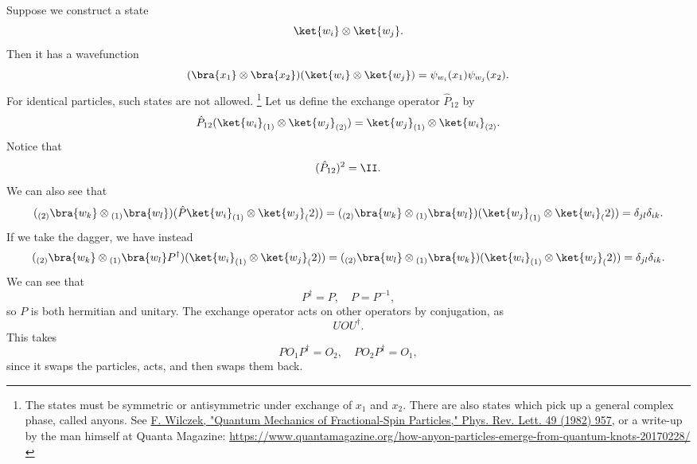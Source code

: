 Suppose we construct a state
\begin{equation}
    \ket{w_i} \otimes \ket{w_j}.
\end{equation}
Then it has a wavefunction
\begin{equation}
    (\bra{x_1} \otimes \bra{x_2}) (\ket{w_i} \otimes\ket{w_j}) = \psi_{w_i}(x_1) \psi_{w_j}(x_2).
\end{equation}
For identical particles, such states are not allowed.%
    \footnote{The states must be symmetric or antisymmetric under exchange of $x_1$ and $x_2$. There are also states which pick up a general complex phase, called anyons. See \href{https://doi.org/10.1103/PhysRevLett.49.957}{F. Wilczek, "Quantum Mechanics of Fractional-Spin Particles," Phys. Rev. Lett. 49 (1982) 957}, or a write-up by the man himself at Quanta Magazine: \url{https://www.quantamagazine.org/how-anyon-particles-emerge-from-quantum-knots-20170228/}}
Let us define the exchange operator $\hat P_{12}$ by
\begin{equation}
    \hat P_{12}(\ket{w_i}_{(1)} \otimes \ket{w_j}_{(2)}) = \ket{w_j}_{(1)} \otimes \ket{w_i}_{(2)}.
\end{equation}
Notice that
\begin{equation}
    (\hat P_{12})^2 = \II.
\end{equation}
We can also see that
\begin{equation}
    ({}_{(2)}\bra{w_k} \otimes{}_{(1)}\bra{w_l}) (\hat P \ket{w_i}_{(1)} \otimes \ket{w_j}_(2)) = ({}_{(2)}\bra{w_k} \otimes{}_{(1)}\bra{w_l}) (\ket{w_j}_{(1)} \otimes \ket{w_i}_(2)) = \delta_{jl} \delta_{ik}.
\end{equation}
If we take the dagger, we have instead
\begin{equation}
    ({}_{(2)}\bra{w_k} \otimes{}_{(1)}\bra{w_l}P^\dagger) (\ket{w_i}_{(1)} \otimes \ket{w_j}_(2)) = ({}_{(2)}\bra{w_l} \otimes{}_{(1)}\bra{w_k}) ( \ket{w_i}_{(1)} \otimes \ket{w_j}_(2)) = \delta_{jl} \delta_{ik}.
\end{equation}
We can see that
\begin{equation}
    P^\dagger = P, \quad P = P^{-1},
\end{equation}
so $P$ is both hermitian and unitary. The exchange operator acts on other operators by conjugation, as 
\begin{equation}
    U O U^\dagger.
\end{equation}
This takes
\begin{equation}
    P O_1 P^\dagger = O_2, \quad P O_2 P^\dagger = O_1,
\end{equation}
since it swaps the particles, acts, and then swaps them back.


